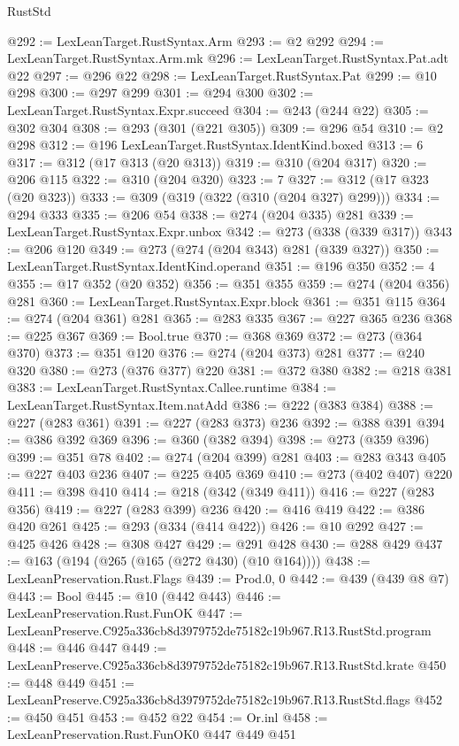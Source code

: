 \begin{lexlean}{RustStd}
\begin{coremodule}
@292 := LexLeanTarget.RustSyntax.Arm
@293 := @2 @292
@294 := LexLeanTarget.RustSyntax.Arm.mk
@296 := LexLeanTarget.RustSyntax.Pat.adt @22
@297 := @296 @22
@298 := LexLeanTarget.RustSyntax.Pat
@299 := @10 @298
@300 := @297 @299
@301 := @294 @300
@302 := LexLeanTarget.RustSyntax.Expr.succeed
@304 := @243 (@244 @22)
@305 := @302 @304
@308 := @293 (@301 (@221 @305))
@309 := @296 @54
@310 := @2 @298
@312 := @196 LexLeanTarget.RustSyntax.IdentKind.boxed
@313 := 6
@317 := @312 (@17 @313 (@20 @313))
@319 := @310 (@204 @317)
@320 := @206 @115
@322 := @310 (@204 @320)
@323 := 7
@327 := @312 (@17 @323 (@20 @323))
@333 := @309 (@319 (@322 (@310 (@204 @327) @299)))
@334 := @294 @333
@335 := @206 @54
@338 := @274 (@204 @335) @281
@339 := LexLeanTarget.RustSyntax.Expr.unbox
@342 := @273 (@338 (@339 @317))
@343 := @206 @120
@349 := @273 (@274 (@204 @343) @281 (@339 @327))
@350 := LexLeanTarget.RustSyntax.IdentKind.operand
@351 := @196 @350
@352 := 4
@355 := @17 @352 (@20 @352)
@356 := @351 @355
@359 := @274 (@204 @356) @281
@360 := LexLeanTarget.RustSyntax.Expr.block
@361 := @351 @115
@364 := @274 (@204 @361) @281
@365 := @283 @335
@367 := @227 @365 @236
@368 := @225 @367
@369 := Bool.true
@370 := @368 @369
@372 := @273 (@364 @370)
@373 := @351 @120
@376 := @274 (@204 @373) @281
@377 := @240 @320
@380 := @273 (@376 @377) @220
@381 := @372 @380
@382 := @218 @381
@383 := LexLeanTarget.RustSyntax.Callee.runtime
@384 := LexLeanTarget.RustSyntax.Item.natAdd
@386 := @222 (@383 @384)
@388 := @227 (@283 @361)
@391 := @227 (@283 @373) @236
@392 := @388 @391
@394 := @386 @392 @369
@396 := @360 (@382 @394)
@398 := @273 (@359 @396)
@399 := @351 @78
@402 := @274 (@204 @399) @281
@403 := @283 @343
@405 := @227 @403 @236
@407 := @225 @405 @369
@410 := @273 (@402 @407) @220
@411 := @398 @410
@414 := @218 (@342 (@349 @411))
@416 := @227 (@283 @356)
@419 := @227 (@283 @399) @236
@420 := @416 @419
@422 := @386 @420 @261
@425 := @293 (@334 (@414 @422))
@426 := @10 @292
@427 := @425 @426
@428 := @308 @427
@429 := @291 @428
@430 := @288 @429
@437 := @163 (@194 (@265 (@165 (@272 @430) (@10 @164))))
@438 := LexLeanPreservation.Rust.Flags
@439 := Prod.{0, 0}
@442 := @439 (@439 @8 @7)
@443 := Bool
@445 := @10 (@442 @443)
@446 := LexLeanPreservation.Rust.FunOK
@447 := LexLeanPreserve.C925a336cb8d3979752de75182c19b967.R13.RustStd.program
@448 := @446 @447
@449 := LexLeanPreserve.C925a336cb8d3979752de75182c19b967.R13.RustStd.krate
@450 := @448 @449
@451 := LexLeanPreserve.C925a336cb8d3979752de75182c19b967.R13.RustStd.flags
@452 := @450 @451
@453 := @452 @22
@454 := Or.inl
@458 := LexLeanPreservation.Rust.FunOK0 @447 @449 @451

\end{coremodule}
\end{lexlean}

